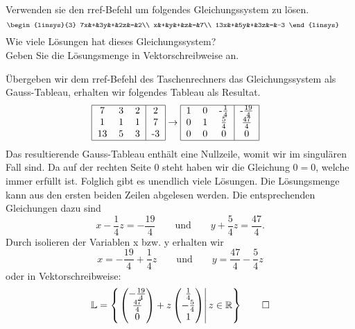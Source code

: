 Verwenden sie den rref-Befehl um folgendes Gleichungssystem zu lösen.
\[
\begin{linsys}{3}
7x&+&3y&+&2z&=&2\\
x&+&y&+&z&=&7\\
13x&+&5y&+&3z&=&-3
\end{linsys}
\qquad
\]
Wie viele Lösungen hat dieses Gleichungssystem?\\
Geben Sie die Lösungsmenge in Vektorschreibweise an.

\begin{loesung}
Übergeben wir dem rref-Befehl des Taschenrechners das Gleichungssystem
als Gauss-Tableau, erhalten wir folgendes Tableau als Resultat.
\begin{align*}
\begin{tabular}{|ccc|c|}
\hline
7&3&2&2\\
1&1&1&7\\
13&5&3&-3\\
\hline
\end{tabular}
&
\rightarrow
\begin{tabular}{|ccc|c|}
\hline
1&0&-$\frac{1}{4}$&-$\frac{19}{4}$\\
0&1&$\frac{5}{4}$&$\frac{47}{4}$\\
0&0&0&0\\
\hline
\end{tabular}
\end{align*}
Das resultierende Gauss-Tableau enthält eine Nullzeile, womit wir im singulären Fall sind.
Da auf der rechten Seite 0 steht haben wir die Gleichung $0=0$, welche immer erfüllt ist.
Folglich gibt es unendlich viele Lösungen. Die Lösungsmenge kann aus den ersten beiden
Zeilen abgelesen werden. Die entsprechenden Gleichungen dazu sind
\[
x-\frac{1}{4}z = -\frac{19}{4}\qquad\text{und}\qquad y+\frac{5}{4}z = \frac{47}{4}.
\]
Durch isolieren der Variablen x bzw. y erhalten wir
\[
x = -\frac{19}{4} +\frac{1}{4}z\qquad\text{und}\qquad y = \frac{47}{4} -\frac{5}{4}z
\]
oder in Vektorschreibweise:
\[
\mathbb L =\left\{\left.
 \begin{pmatrix}
-\frac{19}{4}\\\frac{47}{4}\\0
\end{pmatrix}
+z\begin{pmatrix}
\frac{1}{4}\\-\frac{5}{4}\\1
\end{pmatrix}\right | z\in \mathbb R
\right\}
\qedhere
\]
\end{loesung}

